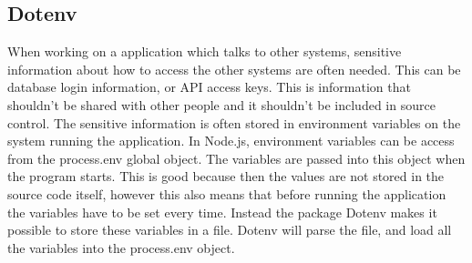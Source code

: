 \subsection{Dotenv}
When working on a application which talks to other systems, sensitive information about how to access the other systems are often needed. This can be database login information, or API access keys. This is information that shouldn't be shared with other people and it shouldn't be included in source control. The sensitive information is often stored in environment variables on the system running the application. In Node.js, environment variables can be access from the process.env global object. The variables are passed into this object when the program starts. This is good because then the values are not stored in the source code itself, however this also means that before running the application the variables have to be set every time. Instead the package Dotenv makes it possible to store these variables in a file. Dotenv will parse the file, and load all the variables into the process.env object.
